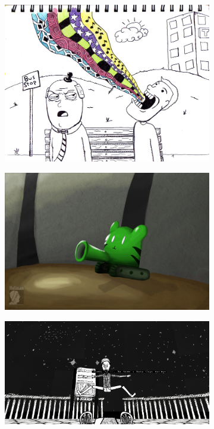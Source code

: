\begin{figure}[H]
  \centering\begin{subfigure}{.5\textwidth}
    \centering
    \includegraphics[width=.9\linewidth]{images/ref_MICHAEL02}
  \end{subfigure}
  \begin{subfigure}{.45\textwidth}
    \centering
    \includegraphics[width=.9\linewidth]{images/ref_MICHAEL01}
  \end{subfigure}
  \begin{subfigure}{.5\textwidth}
    \centering
    \includegraphics[width=.9\linewidth]{images/ref_MICHAEL03}

\end{subfigure}
\end{figure}
